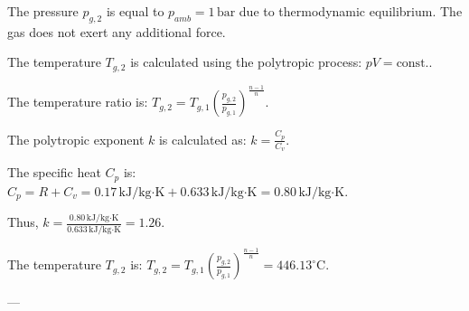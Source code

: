 The pressure \( p_{g,2} \) is equal to \( p_{amb} = 1 \, \text{bar} \) due to thermodynamic equilibrium.  
The gas does not exert any additional force.  

The temperature \( T_{g,2} \) is calculated using the polytropic process:  
\( pV = \text{const.} \).  

The temperature ratio is:  
\( T_{g,2} = T_{g,1} \left( \frac{p_{g,2}}{p_{g,1}} \right)^{\frac{n-1}{n}} \).  

The polytropic exponent \( k \) is calculated as:  
\( k = \frac{C_p}{C_v} \).  

The specific heat \( C_p \) is:  
\( C_p = R + C_v = 0.17 \, \text{kJ/kg·K} + 0.633 \, \text{kJ/kg·K} = 0.80 \, \text{kJ/kg·K} \).  

Thus, \( k = \frac{0.80 \, \text{kJ/kg·K}}{0.633 \, \text{kJ/kg·K}} = 1.26 \).  

The temperature \( T_{g,2} \) is:  
\( T_{g,2} = T_{g,1} \left( \frac{p_{g,2}}{p_{g,1}} \right)^{\frac{n-1}{n}} = 446.13^\circ \text{C} \).  

---